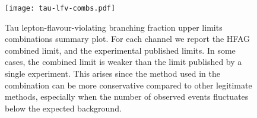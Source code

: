 \begin{figure}[tb]
  \begin{center}
    \texttt{[image: tau-lfv-combs.pdf]}
    \caption{Tau lepton-flavour-violating branching fraction upper limits
      combinations summary plot. For each channel we report the HFAG
      combined limit, and the experimental published limits. In some cases,
      the combined limit is weaker than the limit published by a single
      experiment. This arises since the \cls method used in the
      combination can be more conservative compared to other legitimate
      methods, especially when the number of observed events fluctuates below the
      expected background. 
      \label{fig:tau:lfv-limits-plot-average}
    }
  \end{center}
\end{figure}


